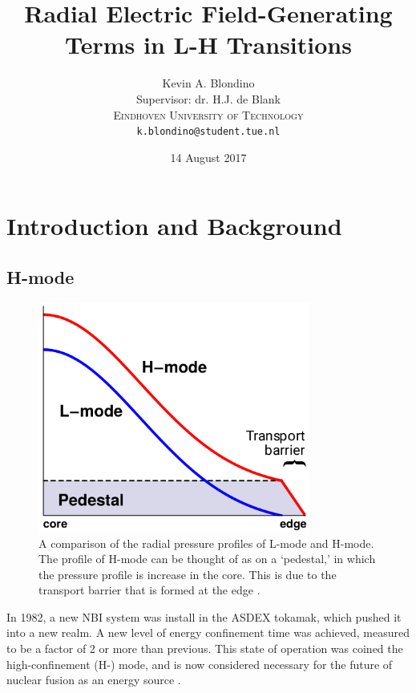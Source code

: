 \documentclass[a4paper]{article}
\title{Radial Electric Field-Generating Terms in L-H Transitions}
\author{{\Large Kevin A. Blondino} \\
	Supervisor: dr. H.J. de Blank \\
	\textsc{Eindhoven University of Technology} \\
	\texttt{k.blondino@student.tue.nl}}
\date{14 August 2017}
\begin{document}
\maketitle


\begin{abstract}
	
\end{abstract}

\section{Introduction and Background}
\subsection{H-mode}
\begin{figure}[b]
\begin{minipage}{0.48\linewidth}
	\centering
	\includegraphics[width=0.8\textwidth]{../../Graphics/L-mode_H-mode_compare.png}
\end{minipage}
\hfill
\begin{minipage}{0.48\linewidth}
	\caption{A comparison of the radial pressure profiles of L-mode and H-mode.
	The profile of H-mode can be thought of as on a `pedestal,' in which the pressure profile is increase in the core.
	This is due to the transport barrier that is formed at the edge \cite{weymiens_bifurcation_2014}.}
	\label{fig:L-mode_H-mode_compare}
\end{minipage}
\end{figure}

In 1982, a new NBI system was install in the ASDEX tokamak, which pushed it into a new realm.
A new level of energy confinement time was achieved, measured to be a factor of 2 or more than previous.
This state of operation was coined the high-confinement (H-) mode, and is now considered necessary for the future of nuclear fusion as an energy source \cite{arnoux_how_2009} \cite{wagner_development_1984}.
\end{document}
